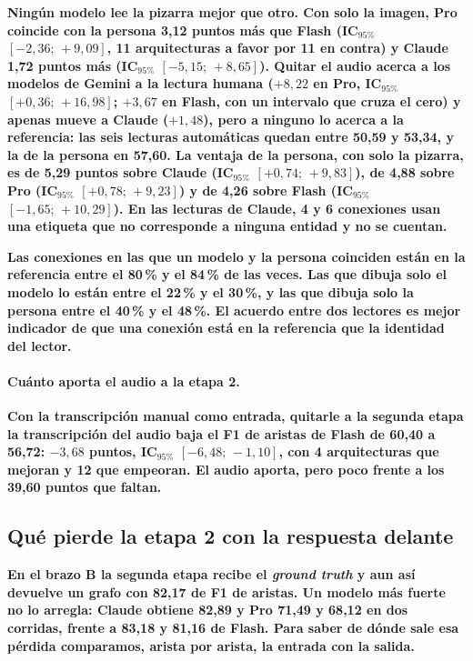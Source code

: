 \documentclass[a4paper, twocolumn, 10pt]{IEEEtran}
\newcommand{\nuevo}[1]{{\bfseries #1}}
\begin{document}
\nuevo{Ningún modelo lee la pizarra mejor que otro. Con solo la imagen, Pro coincide
con la persona 3,12 puntos más que Flash (IC$_{95\%}$ $[-2{,}36;\,+9{,}09]$, 11
arquitecturas a favor por 11 en contra) y Claude 1,72 puntos más (IC$_{95\%}$
$[-5{,}15;\,+8{,}65]$). Quitar el audio acerca a los modelos de Gemini a la lectura
humana ($+8{,}22$ en Pro, IC$_{95\%}$ $[+0{,}36;\,+16{,}98]$; $+3{,}67$ en Flash, con
un intervalo que cruza el cero) y apenas mueve a Claude ($+1{,}48$), pero a ninguno
lo acerca a la referencia: las seis lecturas automáticas quedan entre 50,59 y 53,34,
y la de la persona en 57,60. La ventaja de la persona, con solo la pizarra, es de
5,29 puntos sobre Claude (IC$_{95\%}$ $[+0{,}74;\,+9{,}83]$), de 4,88 sobre Pro
(IC$_{95\%}$ $[+0{,}78;\,+9{,}23]$) y de 4,26 sobre Flash (IC$_{95\%}$
$[-1{,}65;\,+10{,}29]$). En las lecturas de Claude, 4 y 6 conexiones usan una etiqueta
que no corresponde a ninguna entidad y no se cuentan.}

\nuevo{Las conexiones en las que un modelo y la persona coinciden están en la
referencia entre el 80\,\% y el 84\,\% de las veces. Las que dibuja solo el modelo
lo están entre el 22\,\% y el 30\,\%, y las que dibuja solo la persona entre el
40\,\% y el 48\,\%. El acuerdo entre dos lectores es mejor indicador de que una
conexión está en la referencia que la identidad del lector.}

\paragraph{\nuevo{Cuánto aporta el audio a la etapa 2.}} \nuevo{Con la transcripción manual
como entrada, quitarle a la segunda etapa la transcripción del audio baja el F1 de
aristas de Flash de 60,40 a 56,72: $-3{,}68$ puntos, IC$_{95\%}$
$[-6{,}48;\,-1{,}10]$, con 4 arquitecturas que mejoran y 12 que empeoran. El audio
aporta, pero poco frente a los 39,60 puntos que faltan.}

\subsection{\nuevo{Qué pierde la etapa 2 con la respuesta delante}}
\label{sec:ledger}

\nuevo{En el brazo B la segunda etapa recibe el \emph{ground truth} y aun así
devuelve un grafo con 82,17 de F1 de aristas. Un modelo más fuerte no lo arregla:
Claude obtiene 82,89 y Pro 71,49 y 68,12 en dos corridas, frente a 83,18 y 81,16 de
Flash. Para saber de dónde sale esa pérdida comparamos, arista por arista, la
entrada con la salida.}
\end{document}

